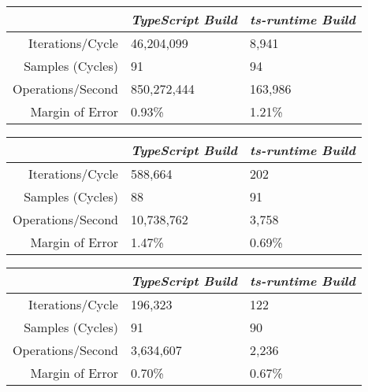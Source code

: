 \begin{center}
{
\centering
\tabulinesep=1.2mm
\setlength{\tabcolsep}{5mm}
\def\arraystretch{1.25}
\small
\begin{tabu} to \textwidth {|r||X[c,m]|X[c,m]|}
  \hline
  & \emph{TypeScript Build} & \emph{ts-runtime Build} \\
  \hline
  \hline
  Iterations/Cycle  & 46,204,099 & 8,941 \\
  \hline
  Samples (Cycles)  & 91 & 94 \\
  \hline
  Operations/Second & 850,272,444 & 163,986 \\
  \hline
  Margin of Error   & 0.93\% & 1.21\% \\
  \hline
\end{tabu}
}
\end{center}

\begin{center}
{
\centering
\tabulinesep=1.2mm
\setlength{\tabcolsep}{5mm}
\def\arraystretch{1.25}
\small
\begin{tabu} to \textwidth {|r||X[c,m]|X[c,m]|}
  \hline
  & \emph{TypeScript Build} & \emph{ts-runtime Build} \\
  \hline
  \hline
  Iterations/Cycle  & 588,664 & 202 \\
  \hline
  Samples (Cycles)  & 88 & 91 \\
  \hline
  Operations/Second & 10,738,762 & 3,758 \\
  \hline
  Margin of Error   & 1.47\% & 0.69\% \\
  \hline
\end{tabu}
}
\end{center}

\begin{center}
{
\centering
\tabulinesep=1.2mm
\setlength{\tabcolsep}{5mm}
\def\arraystretch{1.25}
\small
\begin{tabu} to \textwidth {|r||X[c,m]|X[c,m]|}
  \hline
  & \emph{TypeScript Build} & \emph{ts-runtime Build} \\
  \hline
  \hline
  Iterations/Cycle  & 196,323 & 122 \\
  \hline
  Samples (Cycles)  & 91 & 90 \\
  \hline
  Operations/Second & 3,634,607 & 2,236 \\
  \hline
  Margin of Error   & 0.70\% & 0.67\% \\
  \hline
\end{tabu}
}
\end{center}

